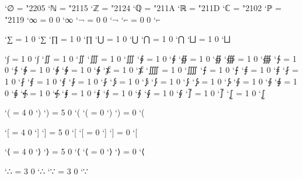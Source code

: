 \Umathcodenum`∅ = "2205
\Umathcodenum`ℕ = "2115
\Umathcodenum`ℤ = "2124
\Umathcodenum`ℚ = "211A
\Umathcodenum`ℝ = "211D
\Umathcodenum`ℂ = "2102
\Umathcodenum`ℙ = "2119
\Umathcode`∞ = 0 0 `∞
\Umathcode`¬ = 0 0 `¬
\Umathcode`⌐ = 0 0 `⌐
 

\Umathcode`∑ = 1 0 `∑
\Umathcode`∏ = 1 0 `∏
\Umathcode`⋃ = 1 0 `⋃
\Umathcode`⋂ = 1 0 `⋂
\Umathcode`⨆ = 1 0 `⨆

\Umathcode`∫ = 1 0 `∫   \Umathcode`∬ = 1 0 `∬   \Umathcode`∭ = 1 0 `∭
\Umathcode`∮ = 1 0 `∮   \Umathcode`∯ = 1 0 `∯   \Umathcode`∰ = 1 0 `∰
\Umathcode`∱ = 1 0 `∱   \Umathcode`∲ = 1 0 `∲   \Umathcode`∳ = 1 0 `∳
\Umathcode`⨋ = 1 0 `⨋   \Umathcode`⨌ = 1 0 `⨌   \Umathcode`⨍ = 1 0 `⨍
\Umathcode`⨎ = 1 0 `⨎   \Umathcode`⨏ = 1 0 `⨏   \Umathcode`⨐ = 1 0 `⨐
\Umathcode`⨑ = 1 0 `⨑   \Umathcode`⨒ = 1 0 `⨒   \Umathcode`⨓ = 1 0 `⨓
\Umathcode`⨔ = 1 0 `⨔   \Umathcode`⨕ = 1 0 `⨕   \Umathcode`⨖ = 1 0 `⨖
\Umathcode`⨗ = 1 0 `⨗   \Umathcode`⨘ = 1 0 `⨘   \Umathcode`⨙ = 1 0 `⨙
\Umathcode`⨚ = 1 0 `⨚   \Umathcode`⨛ = 1 0 `⨛   \Umathcode`⨜ = 1 0 `⨜

\Umathcode`( = 4 0 `)   \Umathcode`) = 5 0 `(
\Udelcode`( = 0 `)       %
\Udelcode`) = 0 `(       %

\Umathcode`[ = 4 0 `]   \Umathcode`] = 5 0 `[
\Udelcode`[ = 0 `]       %
\Udelcode`] = 0 `[       %


\def\{{\Udelimiter"4"0"007D }
\def\}{\Udelimiter"5"0"007B }

\Umathcode`⟨ = 4 0 `⟩   \Umathcode`⟩ = 5 0 `⟨
\Udelcode`⟨ = 0 `⟩       %
\Udelcode`⟩ = 0 `⟨       %

\Umathcode`∴ = 3 0 `∴
\Umathcode`∵ = 3 0 `∵

\def\int{∫}
\def\iint{∬}
\def\iiint{∭}
\def\oint{∮}
\def\oiint{∯}
\def\oiiint{∰}
\def\therefore{∴}
\def\because{∵}


